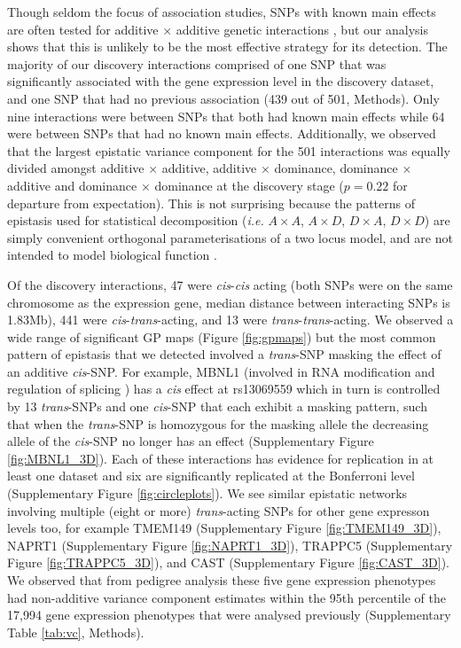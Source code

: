 \documentclass{article}
\begin{document}
Though seldom the focus of association studies, SNPs with known main effects are often tested for additive $\times$ additive genetic interactions \cite{Cordell2009}, but our analysis shows that this is unlikely to be the most effective strategy for its detection. The majority of our discovery interactions comprised of one SNP that was significantly associated with the gene expression level in the discovery dataset, and one SNP that had no previous association \cite{Powell2013} (439 out of 501, Methods). Only nine interactions were between SNPs that both had known main effects while 64 were between SNPs that had no known main effects. Additionally, we observed that the largest epistatic variance component for the 501 interactions was equally divided amongst additive $\times$ additive, additive $\times$ dominance, dominance $\times$ additive and dominance $\times$ dominance at the discovery stage ($p = 0.22$ for departure from expectation). This is not surprising because the patterns of epistasis used for statistical decomposition (\emph{i.e.} $A \times A$, $A \times D$, $D \times A$, $D \times D$) are simply convenient orthogonal parameterisations of a two locus model, and are not intended to model biological function \cite{Cockerham1954}.

Of the discovery interactions, 47 were \emph{cis}-\emph{cis} acting (both SNPs were on the same chromosome as the expression gene, median distance between interacting SNPs is 1.83Mb), 441 were \emph{cis}-\emph{trans}-acting, and 13 were \emph{trans}-\emph{trans}-acting. We observed a wide range of significant GP maps (Figure \ref{fig:gpmaps}) but the most common pattern of epistasis that we detected involved a \emph{trans}-SNP masking the effect of an additive \emph{cis}-SNP. For example, MBNL1 (involved in RNA modification and regulation of splicing \cite{Ho2004}) has a \emph{cis} effect at rs13069559 which in turn is controlled by 13 \emph{trans}-SNPs and one \emph{cis}-SNP that each exhibit a masking pattern, such that when the \emph{trans}-SNP is homozygous for the masking allele the decreasing allele of the \emph{cis}-SNP no longer has an effect (Supplementary Figure \ref{fig:MBNL1_3D}). Each of these interactions has evidence for replication in at least one dataset and six are significantly replicated at the Bonferroni level (Supplementary Figure \ref{fig:circleplots}). We see similar epistatic networks involving multiple (eight or more) \emph{trans}-acting SNPs for other gene expresson levels too, for example TMEM149 (Supplementary Figure \ref{fig:TMEM149_3D}), NAPRT1 (Supplementary Figure \ref{fig:NAPRT1_3D}), TRAPPC5 (Supplementary Figure \ref{fig:TRAPPC5_3D}), and CAST (Supplementary Figure \ref{fig:CAST_3D}). We observed that from pedigree analysis these five gene expression phenotypes had non-additive variance component estimates within the 95th percentile of the 17,994 gene expression phenotypes that were analysed previously \cite{Powell2013} (Supplementary Table \ref{tab:vc}, Methods).
\end{document}
